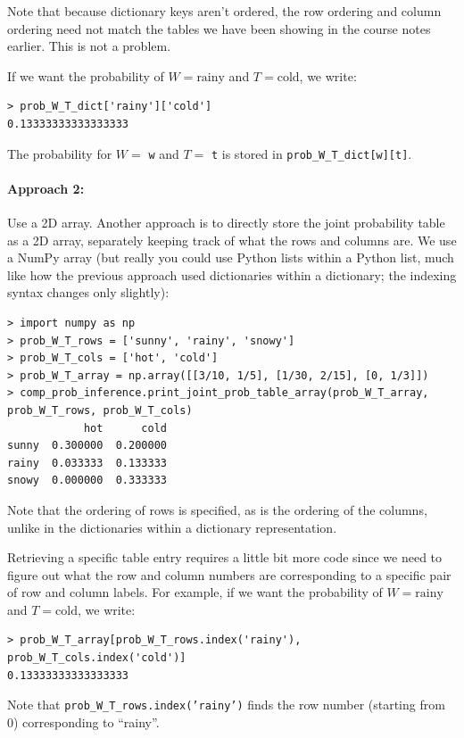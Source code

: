 \documentclass[6008notes.tex]{subfiles}
\begin{document}
Note that because dictionary keys aren't ordered, the row ordering and column ordering need not match the tables we have been showing in the course notes earlier. This is not a problem.

If we want the probability of $W=\text {rainy}$ and $T=\text {cold}$, we write:

\begin{lstlisting}
> prob_W_T_dict['rainy']['cold']
0.13333333333333333
\end{lstlisting}

The probability for $W =$ \texttt{w} and $T =$ \texttt{t} is stored in \lstinline{prob_W_T_dict[w][t]}.

\paragraph{Approach 2:} Use a 2D array. Another approach is to directly store the joint probability table as a 2D array, separately keeping track of what the rows and columns are. We use a NumPy array (but really you could use Python lists within a Python list, much like how the previous approach used dictionaries within a dictionary; the indexing syntax changes only slightly):

\begin{lstlisting}
> import numpy as np
> prob_W_T_rows = ['sunny', 'rainy', 'snowy']
> prob_W_T_cols = ['hot', 'cold']
> prob_W_T_array = np.array([[3/10, 1/5], [1/30, 2/15], [0, 1/3]])
> comp_prob_inference.print_joint_prob_table_array(prob_W_T_array, prob_W_T_rows, prob_W_T_cols)
            hot      cold
sunny  0.300000  0.200000
rainy  0.033333  0.133333
snowy  0.000000  0.333333
\end{lstlisting}

Note that the ordering of rows is specified, as is the ordering of the columns, unlike in the dictionaries within a dictionary representation.

Retrieving a specific table entry requires a little bit more code since we need to figure out what the row and column numbers are corresponding to a specific pair of row and column labels. For example, if we want the probability of $W=\text {rainy}$ and $T=\text {cold}$, we write:

\begin{lstlisting}
> prob_W_T_array[prob_W_T_rows.index('rainy'), prob_W_T_cols.index('cold')]
0.13333333333333333
\end{lstlisting}

Note that \texttt{prob\_W\_T\_rows.index('rainy')} finds the row number (starting from 0) corresponding to ``rainy''.
\end{document}

